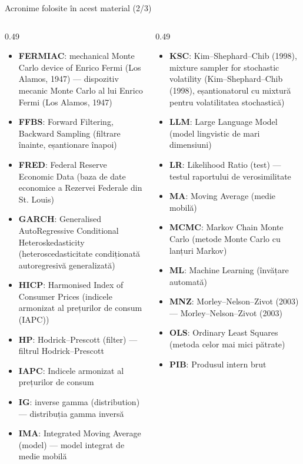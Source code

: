 \begin{frame}{Acronime folosite în acest material (2/3)}
\begin{columns}[T]
\begin{column}{0.49\textwidth}
\begin{itemize}\setlength{\itemsep}{0pt}
    \item \textbf{FERMIAC}: mechanical Monte Carlo device of Enrico Fermi (Los Alamos, 1947) — dispozitiv mecanic Monte Carlo al lui Enrico Fermi (Los Alamos, 1947)
    \item \textbf{FFBS}: Forward Filtering, Backward Sampling (filtrare înainte, eșantionare înapoi)
    \item \textbf{FRED}: Federal Reserve Economic Data (baza de date economice a Rezervei Federale din St. Louis)
    \item \textbf{GARCH}: Generalised AutoRegressive Conditional Heteroskedasticity (heteroscedasticitate condiționată autoregresivă generalizată)
    \item \textbf{HICP}: Harmonised Index of Consumer Prices (indicele armonizat al prețurilor de consum (IAPC))
    \item \textbf{HP}: Hodrick–Prescott (filter) — filtrul Hodrick–Prescott
    \item \textbf{IAPC}: Indicele armonizat al prețurilor de consum
    \item \textbf{IG}: inverse gamma (distribution) — distribuția gamma inversă
    \item \textbf{IMA}: Integrated Moving Average (model) — model integrat de medie mobilă
\end{itemize}
\end{column}
\begin{column}{0.49\textwidth}
\begin{itemize}\setlength{\itemsep}{0pt}
    \item \textbf{KSC}: Kim–Shephard–Chib (1998), mixture sampler for stochastic volatility (Kim–Shephard–Chib (1998), eșantionatorul cu mixtură pentru volatilitatea stochastică)
    \item \textbf{LLM}: Large Language Model (model lingvistic de mari dimensiuni)
    \item \textbf{LR}: Likelihood Ratio (test) — testul raportului de verosimilitate
    \item \textbf{MA}: Moving Average (medie mobilă)
    \item \textbf{MCMC}: Markov Chain Monte Carlo (metode Monte Carlo cu lanțuri Markov)
    \item \textbf{ML}: Machine Learning (învățare automată)
    \item \textbf{MNZ}: Morley–Nelson–Zivot (2003) — Morley–Nelson–Zivot (2003)
    \item \textbf{OLS}: Ordinary Least Squares (metoda celor mai mici pătrate)
    \item \textbf{PIB}: Produsul intern brut
\end{itemize}
\end{column}
\end{columns}
\end{frame}
